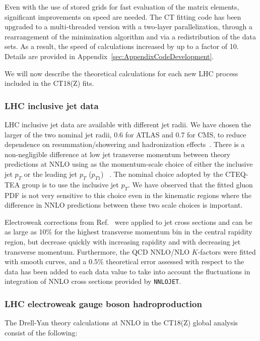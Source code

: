 Even with the use of stored grids for fast evaluation of the matrix
elements, significant improvements on speed are needed. The CT fitting
code has been upgraded to a multi-threaded version with a two-layer
parallelization, through a rearrangement of the minimization
algorithm and via a redistribution of the data sets. As a result, the speed of calculations increased by up to a factor of 10. Details are provided in
Appendix~\ref{sec:AppendixCodeDevelopment}.  

We will now describe the theoretical calculations for each new LHC process included in the CT18(Z) fits.
%

\subsubsection{LHC inclusive jet data
\label{sec:TheoryJets}
}

LHC inclusive jet data are available with different jet radii. We have chosen the larger of the two nominal jet radii, 
0.6 for ATLAS and 0.7 for CMS, to reduce dependence on resummation/showering and hadronization effects~\cite{Bellm:2019yyh}. 
There is a non-negligible difference at low jet transverse momentum between theory predictions at NNLO 
using as the momentum-scale choice of either the inclusive jet $p_T$ or the leading jet $p_T$ ($p_{T1}$)~\cite{Currie:2018xkj} .
The nominal choice adopted by the CTEQ-TEA group is to use the inclusive jet $p_T$. 
We have observed that the fitted gluon PDF is not very sensitive to this choice even in the kinematic regions 
where the difference in NNLO predictions between these two scale choices is important.
%

Electroweak corrections from Ref.~\cite{Dittmaier:2012kx} were applied
to jet cross sections and can be as large as 10\% for the highest transverse momentum bin in the central
rapidity region, but decrease quickly with increasing rapidity and with decreasing jet transverse momentum.
Furthermore, the QCD NNLO/NLO $K$-factors were fitted with smooth curves, and a 0.5\% theoretical error
assessed with respect to the data has been added to each data value to take into account the fluctuations
in integration of NNLO cross sections provided by \texttt{NNLOJET}.  


%
\subsubsection{LHC electroweak gauge boson hadroproduction}
%
The Drell-Yan theory calculations at NNLO in the CT18(Z) global analysis consist of the following:

